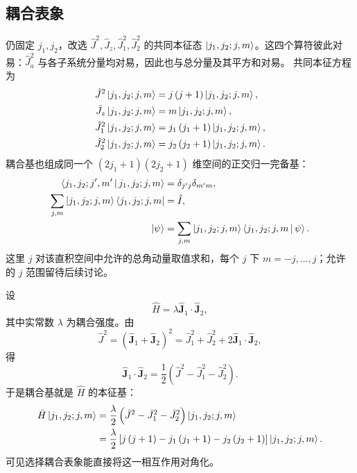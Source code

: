 \subsection{耦合表象}
仍固定 $j_1,j_2$，改选 $\hat J^2,\hat J_z,\hat J_1^2,\hat J_2^2$ 的共同本征态
$\Ket{j_1,j_2;j,m}$。这四个算符彼此对易：$\hat J_a^2$ 与各子系统分量均对易，因此也与总分量及其平方和对易。
共同本征方程为
\begin{align}
\hat J^2\Ket{j_1,j_2;j,m}&=j\left(j+1\right)\Ket{j_1,j_2;j,m},\\
\hat J_z\Ket{j_1,j_2;j,m}&=m\Ket{j_1,j_2;j,m},\\
\hat J_1^2\Ket{j_1,j_2;j,m}&=j_1\left(j_1+1\right)\Ket{j_1,j_2;j,m},\\
\hat J_2^2\Ket{j_1,j_2;j,m}&=j_2\left(j_2+1\right)\Ket{j_1,j_2;j,m}.
\end{align}
耦合基也组成同一个 $\left(2j_1+1\right)\left(2j_2+1\right)$ 维空间的正交归一完备基：
\begin{align}
\Braket{j_1,j_2;j',m'|j_1,j_2;j,m}&=\delta_{j'j}\delta_{m'm},\\
\sum_{j,m}\Ket{j_1,j_2;j,m}\Bra{j_1,j_2;j,m}&=\hat I,\\
\Ket{\psi}&=\sum_{j,m}\Ket{j_1,j_2;j,m}\Braket{j_1,j_2;j,m|\psi}.
\end{align}
这里 $j$ 对该直积空间中允许的总角动量取值求和，每个 $j$ 下 $m=-j,\ldots,j$；允许的 $j$ 范围留待后续讨论。

\begin{example}[耦合表象的应用]
设
\begin{equation}
\hat H=\lambda\hat{\bm J}_1\cdot\hat{\bm J}_2,
\end{equation}
其中实常数 $\lambda$ 为耦合强度。由
\begin{equation}
\hat J^2=\left(\hat{\bm J}_1+\hat{\bm J}_2\right)^2
=\hat J_1^2+\hat J_2^2+2\hat{\bm J}_1\cdot\hat{\bm J}_2,
\end{equation}
得
\begin{equation}
\hat{\bm J}_1\cdot\hat{\bm J}_2
=\frac12\left(\hat J^2-\hat J_1^2-\hat J_2^2\right).
\end{equation}
于是耦合基就是 $\hat H$ 的本征基：
\begin{align}
\hat H\Ket{j_1,j_2;j,m}
&=\frac\lambda2\left(\hat J^2-\hat J_1^2-\hat J_2^2\right)\Ket{j_1,j_2;j,m}\notag\\
&=\frac\lambda2\left[j\left(j+1\right)-j_1\left(j_1+1\right)-j_2\left(j_2+1\right)\right]
\Ket{j_1,j_2;j,m}.
\end{align}
可见选择耦合表象能直接将这一相互作用对角化。
\end{example}
